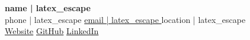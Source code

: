 \documentclass[11pt, letterpaper]{article}
\begin{document}
\begin{center}
  {\Huge\bfseries {{ name | latex_escape }}} \\ \vspace{4pt}
  \small
  {{ phone | latex_escape }} \color{gray}\textbullet\color{black}
  \href{mailto:{{ email | latex_escape }}}{ {{ email | latex_escape }} } \color{gray}\textbullet\color{black}
  {{ location | latex_escape }} \\ \vspace{2pt}
  \href{https://{{ website | latex_escape }}}{Website} \color{gray}\textbullet\color{black}
  \href{https://github.com/{{ github | latex_escape }}}{GitHub} \color{gray}\textbullet\color{black}
  \href{https://linkedin.com/in/{{ linkedin | latex_escape }}}{LinkedIn}
\end{center}
\end{document}
